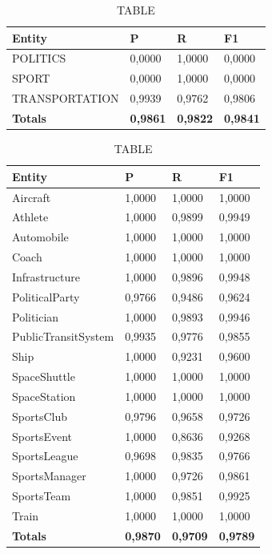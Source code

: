 \documentclass[thesis=M,english]{FITthesis}[2018/05/30]
\begin{document}
	\begin{table}[H]\centering
		\caption{TABLE}
		\label{}
		\begin{tabular}{|l|l|l|l|}
			\hline {\textbf{Entity}} & {\textbf{P}} & {\textbf{R}} & {\textbf{F1}}\\\hline
				POLITICS & 0,0000 & 1,0000 & 0,0000\\
				SPORT & 0,0000 & 1,0000 & 0,0000\\
				TRANSPORTATION & 0,9939 & 0,9762 & 0,9806\\\hline
				\textbf{Totals} & \textbf{0,9861} & \textbf{0,9822} & \textbf{0,9841}\\\hline
		\end{tabular}
	\end{table}	
		


\begin{table}[H]\centering
		\caption{TABLE}
		\label{}
		\begin{tabular}{|l|l|l|l|}
			\hline {\textbf{Entity}} & {\textbf{P}} & {\textbf{R}} & {\textbf{F1}}\\\hline
				Aircraft & 1,0000 & 1,0000 & 1,0000\\
				Athlete & 1,0000 & 0,9899 & 0,9949\\
				Automobile & 1,0000 & 1,0000 & 1,0000\\ 
				Coach & 1,0000 & 1,0000 & 1,0000\\
				Infrastructure & 1,0000 & 0,9896 & 0,9948\\
				PoliticalParty & 0,9766 & 0,9486 & 0,9624\\
				Politician & 1,0000 & 0,9893 & 0,9946\\
				PublicTransitSystem & 0,9935 & 0,9776 & 0,9855\\
				Ship & 1,0000 & 0,9231 & 0,9600\\
				SpaceShuttle & 1,0000 & 1,0000 & 1,0000\\
				SpaceStation & 1,0000 & 1,0000 & 1,0000\\ 
				SportsClub & 0,9796 & 0,9658 & 0,9726\\
				SportsEvent & 1,0000 & 0,8636 & 0,9268\\
				SportsLeague & 0,9698 & 0,9835 & 0,9766\\
				SportsManager & 1,0000 & 0,9726 & 0,9861\\
				SportsTeam & 1,0000 & 0,9851 & 0,9925\\
				Train & 1,0000 & 1,0000 & 1,0000\\\hline
				\textbf{Totals} & \textbf{0,9870} & \textbf{0,9709} & \textbf{0,9789}\\\hline
		\end{tabular}
	\end{table}
\end{document}
